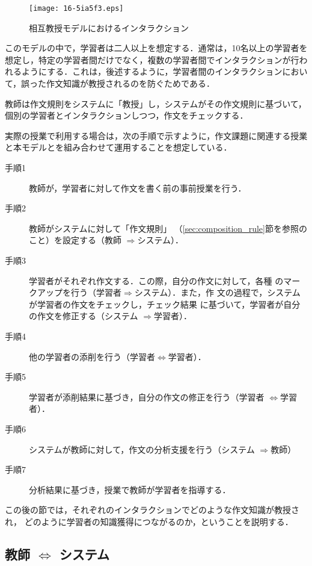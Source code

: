 \documentclass[japanese]{jnlp_1.4}
\begin{document}
\begin{figure}[b]
 \begin{center}
  \texttt{[image: 16-5ia5f3.eps]}
  \caption{相互教授モデルにおけるインタラクション}
  \label{fig:interaction}
 \end{center}   
\end{figure}

このモデルの中で，学習者は二人以上を想定する．通常は，10名以上の学習者を
想定し，特定の学習者間だけでなく，複数の学習者間でインタラクションが行わ
れるようにする．これは，後述するように，学習者間のインタラクションにおい
て，誤った作文知識が教授されるのを防ぐためである．

教師は作文規則をシステムに「教授」し，システムがその作文規則に基づいて，
個別の学習者とインタラクションしつつ，作文をチェックする．

実際の授業で利用する場合は，次の手順で示すように，作文課題に関連する授業
と本モデルとを組み合わせて運用することを想定している．

\begin{description}
 \item[手順1] 教師が，学習者に対して作文を書く前の事前授業を行う．
 \item[手順2] 教師がシステムに対して「作文規則」
	    （\ref{sec:composition_rule}節を参照のこと）を設定する（教師
	    $\Rightarrow$システム）．
 \item[手順3] 学習者がそれぞれ作文する．この際，自分の作文に対して，各種
	    のマークアップを行う（学習者$\Rightarrow$システム）．また，作
	    文の過程で，システムが学習者の作文をチェックし，チェック結果
	    に基づいて，学習者が自分の作文を修正する（システム
	    $\Rightarrow$学習者）．
 \item[手順4] 他の学習者の添削を行う（学習者$\Leftrightarrow$学習者）．
 \item[手順5] 学習者が添削結果に基づき，自分の作文の修正を行う（学習者
	    $\Leftrightarrow$学習者）．
 \item[手順6] システムが教師に対して，作文の分析支援を行う（システム
	    $\Rightarrow$教師）
 \item[手順7] 分析結果に基づき，授業で教師が学習者を指導する．
\end{description}

この後の節では，それぞれのインタラクションでどのような作文知識が教授され，
どのように学習者の知識獲得につながるのか，ということを説明する．


\subsection{教師 $\Leftrightarrow$ システム}
\end{document}
